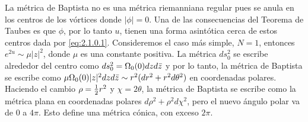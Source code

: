 La métrica de Baptista no es una métrica riemanniana regular pues se anula en los centros de los vórtices donde $|\phi|=0$. Una de las consecuencias del Teorema de Taubes es que $\phi$, por lo tanto $u$, tienen una forma asintótica cerca de estos centros dada por \eqref{eq:2.1.0.1}. Consideremos el caso más simple, $N=1$, entonces $e^{2u}\sim\mu|z|^2$, donde $\mu$ es una constante positiva. La métrica $ds_0^2$ se escribe alrededor del centro como $ds_0^2=\Omega_0(0)dzd\bar z$ y por lo tanto, la métrica de Baptista se escribe como $\mu\Omega_0(0)|z|^2dzd\bar z\sim r^2(dr^2+r^2d\theta^2)$ en coordenadas polares. Haciendo el cambio $\rho=\frac{1}{2} r^2$ y $\chi=2\theta$, la métrica de Baptista se escribe como la métrica plana en coordenadas polares $d\rho^2+\rho^2d\chi^2$, pero el nuevo ángulo polar va de $0$ a $4\pi$. Esto define una métrica cónica, con exceso $2\pi$.

